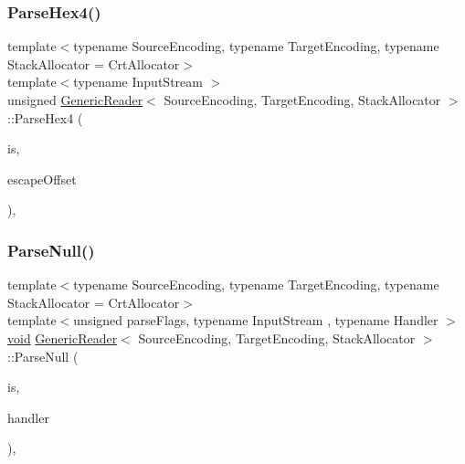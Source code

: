 \subsubsection{\texorpdfstring{Parse\+Hex4()}{ParseHex4()}}
{\footnotesize\ttfamily template$<$typename Source\+Encoding, typename Target\+Encoding, typename Stack\+Allocator = Crt\+Allocator$>$ \\
template$<$typename Input\+Stream $>$ \\
unsigned \hyperlink{classGenericReader}{Generic\+Reader}$<$ Source\+Encoding, Target\+Encoding, Stack\+Allocator $>$\+::Parse\+Hex4 (\begin{DoxyParamCaption}\item[{Input\+Stream \&}]{is,  }\item[{size\+\_\+t}]{escape\+Offset }\end{DoxyParamCaption})\hspace{0.3cm}{\ttfamily [inline]}, {\ttfamily [private]}}

\mbox{\label{classGenericReader_ae624956124c98a85d23decd86a406a0b}} 
\subsubsection{\texorpdfstring{Parse\+Null()}{ParseNull()}}
{\footnotesize\ttfamily template$<$typename Source\+Encoding, typename Target\+Encoding, typename Stack\+Allocator = Crt\+Allocator$>$ \\
template$<$unsigned parse\+Flags, typename Input\+Stream , typename Handler $>$ \\
\hyperlink{imgui__impl__opengl3__loader_8h_ac668e7cffd9e2e9cfee428b9b2f34fa7}{void} \hyperlink{classGenericReader}{Generic\+Reader}$<$ Source\+Encoding, Target\+Encoding, Stack\+Allocator $>$\+::Parse\+Null (\begin{DoxyParamCaption}\item[{Input\+Stream \&}]{is,  }\item[{Handler \&}]{handler }\end{DoxyParamCaption})\hspace{0.3cm}{\ttfamily [inline]}, {\ttfamily [private]}}

\mbox{\label{classGenericReader_a2447207fde31185e2bb8fbf1250b72e0}} 
